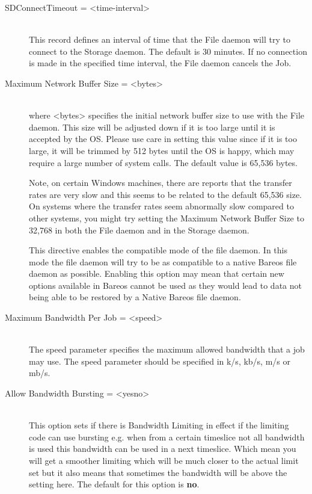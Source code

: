 \begin{description}
\item [SDConnectTimeout = {\textless}time-interval{\textgreater}] \hfill \\
This  record defines an interval of time that  the File daemon will try to
connect to the  Storage daemon. The default is 30 minutes. If no connection
is made in the specified time interval, the File daemon  cancels the Job.

\item [Maximum Network Buffer Size = {\textless}bytes{\textgreater}] \hfill \\
where {\textless}bytes{\textgreater} specifies the initial network buffer  size to use with
the File daemon. This size will be adjusted down  if it is too large until it
is accepted by the OS. Please use  care in setting this value since if it is
too large, it will  be trimmed by 512 bytes until the OS is happy, which may
require  a large number of system calls. The default value is 65,536 bytes.

Note, on certain Windows machines, there are reports that the
transfer rates are very slow and this seems to be related to
the default 65,536 size. On systems where the transfer rates
seem abnormally slow compared to other systems, you might try
setting the Maximum Network Buffer Size to 32,768 in both the
File daemon and in the Storage daemon.

This directive enables the compatible mode of the file daemon. In
this mode the file daemon will try to be as compatible to a native
Bareos file daemon as possible. Enabling this option may mean that
certain new options available in Bareos cannot be used as they would
lead to data not being able to be restored by a Native Bareos file daemon.

\item [Maximum Bandwidth Per Job = {\textless}speed{\textgreater}] \hfill \\
The speed parameter specifies the maximum allowed bandwidth that a job may
use. The speed parameter should be specified in k/s, kb/s, m/s or mb/s.

\item [Allow Bandwidth Bursting = {\textless}yes{\textbar}no{\textgreater}] \hfill \\
This option sets if there is Bandwidth Limiting in effect if the limiting
code can use bursting e.g. when from a certain timeslice not all bandwidth
is used this bandwidth can be used in a next timeslice. Which mean you will
get a smoother limiting which will be much closer to the actual limit set
but it also means that sometimes the bandwidth will be above the setting here.
The default for this option is {\bf no}.


\end{description}
